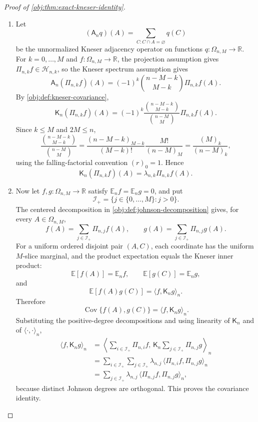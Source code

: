 \begin{proof}[Proof of \cref{obj:thm:exact-kneser-identity}]
\begin{enumerate}
\item Let
\[
(\mathsf A_n q)(A)=\sum_{C:C\cap A=\varnothing}q(C)
\]
be the unnormalized Kneser adjacency operator on functions \(q:\Omega_{n,M}\to\mathbb R\).  For \(k=0,\ldots,M\) and \(f:\Omega_{n,M}\to\mathbb R\), the projection assumption gives \(\Pi_{n,k}f\in\mathcal H_{n,k}\), so the Kneser spectrum assumption gives
\[
\mathsf A_n(\Pi_{n,k}f)(A)
=
(-1)^k\binom{n-M-k}{M-k}\Pi_{n,k}f(A).
\]
By \cref{obj:def:kneser-covariance},
\[
\mathsf K_n(\Pi_{n,k}f)(A)
=
(-1)^k
\frac{\binom{n-M-k}{M-k}}{\binom{n-M}{M}}
\Pi_{n,k}f(A).
\]
Since \(k\le M\) and \(2M\le n\),
\[
\frac{\binom{n-M-k}{M-k}}{\binom{n-M}{M}}
=
\frac{(n-M-k)_{M-k}}{(M-k)!}\frac{M!}{(n-M)_M}
=
\frac{(M)_k}{(n-M)_k},
\]
using the falling-factorial convention \((r)_0=1\).  Hence
\[
\mathsf K_n(\Pi_{n,k}f)(A)
=
\lambda_{n,k}\Pi_{n,k}f(A).
\]

\item Now let \(f,g:\Omega_{n,M}\to\mathbb R\) satisfy \(\mathbb E_n f=\mathbb E_n g=0\), and put
\[
\mathcal I_+=\{j\in\{0,\ldots,M\}:j>0\}.
\]
The centered decomposition in \cref{obj:def:johnson-decomposition} gives, for every \(A\in\Omega_{n,M}\),
\[
f(A)=\sum_{j\in\mathcal I_+}\Pi_{n,j}f(A),
\qquad
g(A)=\sum_{j\in\mathcal I_+}\Pi_{n,j}g(A).
\]
For a uniform ordered disjoint pair \((A,C)\), each coordinate has the uniform \(M\)-slice marginal, and the product expectation equals the Kneser inner product:
\[
\mathbb E[f(A)]=\mathbb E_n f,\qquad
\mathbb E[g(C)]=\mathbb E_n g,
\]
and
\[
\mathbb E[f(A)g(C)]
=
\langle f,\mathsf K_n g\rangle_n .
\]
Therefore
\[
\operatorname{Cov}\{f(A),g(C)\}
=
\langle f,\mathsf K_n g\rangle_n.
\]
Substituting the positive-degree decompositions and using linearity of \(\mathsf K_n\) and of \(\langle\cdot,\cdot\rangle_n\),
\[
\begin{aligned}
\langle f,\mathsf K_n g\rangle_n
&=
\left\langle
\sum_{i\in\mathcal I_+}\Pi_{n,i}f,\,
\mathsf K_n\sum_{j\in\mathcal I_+}\Pi_{n,j}g
\right\rangle_n  \\
&=
\sum_{i\in\mathcal I_+}\sum_{j\in\mathcal I_+}
\lambda_{n,j}\,
\langle \Pi_{n,i}f,\Pi_{n,j}g\rangle_n  \\
&=
\sum_{j\in\mathcal I_+}
\lambda_{n,j}\,
\langle \Pi_{n,j}f,\Pi_{n,j}g\rangle_n ,
\end{aligned}
\]
because distinct Johnson degrees are orthogonal.  This proves the covariance identity.


\end{enumerate}
\end{proof}
